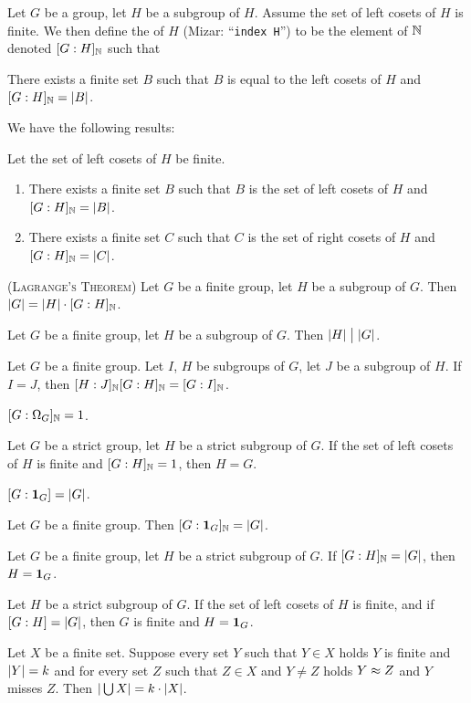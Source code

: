 \documentclass{article}
\begin{document}
\begin{definition}
Let $G$ be a group, let $H$ be a subgroup of $H$. Assume the set of left
cosets of $H$ is finite. We then define the  of $H$
(Mizar: ``\verb#index H#'') to be the element of $\mathbb{N}$ denoted $[G : H]_{\mathbb{N}}$ such that
\begin{defn}
\item There exists a finite set $B$ such that $B$ is equal to the left
  cosets of $H$ and $[G : H]_{\mathbb{N}}=|B|$.
\end{defn}
\end{definition}

We have the following results:
\begin{thm}
\item\label{group2:146} Let the set of left cosets of $H$ be finite.
  \begin{enumerate}[label=(\roman*)]
  \item There exists a finite set $B$ such that $B$ is the set of left
    cosets of $H$ and $[G : H]_{\mathbb{N}}=|B|$.
  \item There exists a finite set $C$ such that $C$ is the set of right
    cosets of $H$ and $[G : H]_{\mathbb{N}}=|C|$.
  \end{enumerate}
\item\label{group2:147}%
(\textsc{Lagrange's Theorem}) Let $G$ be a finite group, let $H$ be a subgroup of $G$. Then $|G|=|H|\cdot[G : H]_{\mathbb{N}}$.
\item\label{group2:148} Let $G$ be a finite group, let $H$ be a subgroup of $G$.
  Then $\card{H}\divides\card{G}$.
\item\label{group2:149} Let $G$ be a finite group.
  Let $I$, $H$ be subgroups of $G$, let $J$ be a subgroup of $H$.
  If $I=J$, then $[H : J]_{\mathbb{N}}[G : H]_{\mathbb{N}}=[G : I]_{\mathbb{N}}$.
\item\label{group2:150} $[G : \Omega_{G}]_{\mathbb{N}}=1$.
\item\label{group2:151} Let $G$ be a strict group, let $H$ be a strict
  subgroup of $G$. If the set of left cosets of $H$ is finite and
  $[G : H]_{\mathbb{N}}=1$, then $H=G$.
\item\label{group2:152} $[G : \mathbf{1}_{G}]=|G|$.
\item\label{group2:153} Let $G$ be a finite group.
  Then $[G : \mathbf{1}_{G}]_{\mathbb{N}}=|G|$.
\item\label{group2:154} Let $G$ be a finite group, let $H$ be a strict
  subgroup of $G$.
  If $[G : H]_{\mathbb{N}}=|G|$, then $H=\mathbf{1}_{G}$.
\item\label{group2:155} Let $H$ be a strict subgroup of $G$.
  If the set of left cosets of $H$ is finite, and if $[G : H]=|G|$,
  then $G$ is finite and $H=\mathbf{1}_{G}$.
\item\label{group2:156} Let $X$ be a finite set.
  Suppose every set $Y$ such that $Y\in X$ holds $Y$ is finite and
  $|Y|=k$ and for every set $Z$ such that $Z\in X$ and $Y\neq Z$
  holds $Y\approx Z$ and $Y$ misses $Z$.
  Then $|\bigcup X|=k\cdot|X|$.
\end{thm}
\end{document}
